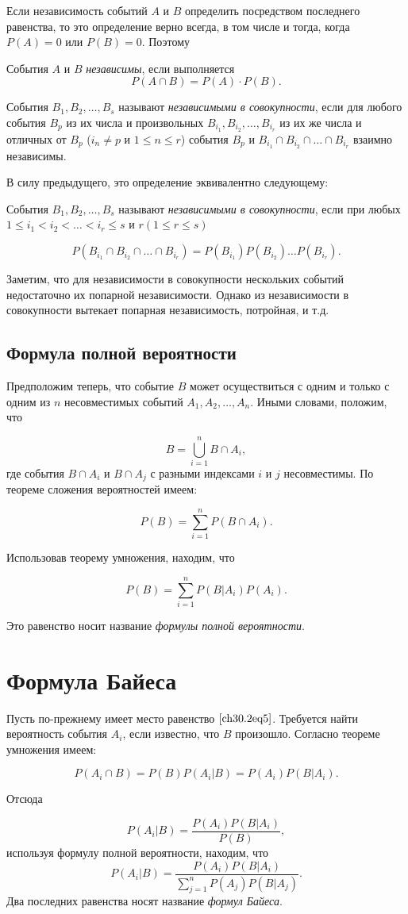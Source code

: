 Если независимость событий $A$ и $B$ определить посредством последнего равенства, то это определение верно всегда, в том числе и тогда, когда $P(A) = 0$ или $P(B) = 0$. Поэтому
\begin{defn}
События $A$ и $B$ \textit{независимы}, если выполняется $$P(A\cap B) = P(A)\cdot P(B).$$
\end{defn}

События $B_1,B_2, \ldots, B_s$ называют \textit{независимыми в совокупности}, если для любого события $B_p$ из их числа и произвольных $B_{i_1}, B_{i_2}, \ldots, B_{i_r}$ из их же числа и отличных от $B_p$  ($i_n \not= p$  и $1 \le n \le r$) события $B_p$ и $B_{i_1}\cap B_{i_2}\cap \ldots\cap B_{i_r}$ взаимно независимы.

В силу предыдущего, это определение эквивалентно следующему:
\begin{defn} События $B_1,B_2, \ldots, B_s$ называют \textit{независимыми в совокупности}, если при любых $1 \le i_1 < i_2 < \ldots < i_r \le s$ и $r (1 \le r \le s)$

$$
P(B_{i_1}\cap B_{i_2}\cap\ldots\cap B_{i_r}) = P(B_{i_1})P(B_{i_2}) \ldots P(B_{i_r}).
$$
\end{defn}
Заметим, что для независимости в совокупности нескольких событий недостаточно их попарной независимости. Однако из независимости в совокупности вытекает попарная независимость, потройная, и т.д.

\subsection{Формула полной вероятности}
Предположим теперь, что событие $B$ может осуществиться с одним и только с одним из $n$ несовместимых событий $A_1,A_2, \ldots, A_n$. Иными словами, положим, что

\begin{equation} \label{ch30.2eq5}
B = \bigcup\limits_{i = 1}^{n} B \cap A_i,
\end{equation}
где события $B\cap A_i$ и $B\cap A_j$ с разными индексами $i$ и $j$ несовместимы. По теореме сложения вероятностей имеем:

$$
P(B) = \sum_{i = 1}^{n} P(B\cap A_i).
$$

Использовав теорему умножения, находим, что

$$
P(B) = \sum_{i = 1}^{n} P(B|A_i)P(A_i).
$$

Это равенство носит название \textit{формулы полной вероятности}.

\section{Формула Байеса}
Пусть по-прежнему имеет место равенство $\eqref{ch30.2eq5}$. Требуется найти вероятность события $A_i$, если известно, что $B$ произошло. Согласно теореме умножения имеем:

$$
P(A_i\cap B) = P(B)P(A_i|B) = P(A_i)P(B|A_i).
$$

Отсюда

$$
P(A_i|B) = \frac{P(A_i)P(B|A_i)}{P(B)},
$$
используя формулу полной вероятности, находим, что
$$
P(A_i|B) = \frac{P(A_i)P(B|A_i)}{\sum\limits_{j = 1}^{n} P(A_j)P(B|A_j)}.
$$
Два последних равенства носят название \textit{формул Байеса}.
